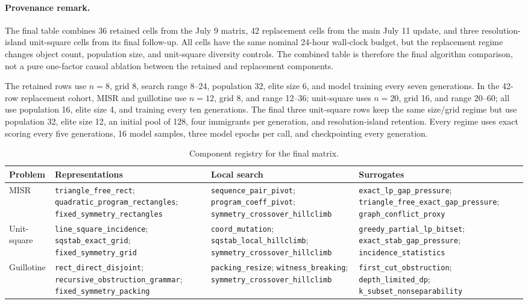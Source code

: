 \documentclass[11pt]{article}
\newcommand{\code}[1]{\texttt{#1}}
\begin{document}
\paragraph{Provenance remark.}
The final table combines 36 retained cells from the July 9 matrix, 42
replacement cells from the main July 11 update, and three resolution-island
unit-square cells from its final follow-up.  All cells have the same
nominal 24-hour wall-clock budget, but the replacement regime changes object
count, population size, and unit-square diversity controls.  The combined
table is therefore the final algorithm comparison, not a pure one-factor
causal ablation between the retained and replacement components.

The retained rows use $n=8$, grid 8, search range 8--24, population 32, elite
size 6, and model training every seven generations.  In the 42-row replacement
cohort, MISR and guillotine use $n=12$, grid 8, and range 12--36; unit-square
uses $n=20$, grid 16, and range 20--60; all use population 16, elite size 4,
and training every ten generations.  The final three unit-square rows keep the
same size/grid regime but use population 32, elite size 12, an initial pool of
128, four immigrants per generation, and resolution-island retention.  Every
regime uses exact scoring every five generations, 16 model samples, three
model epochs per call, and checkpointing every generation.

\begin{table}[tbp]
\centering
\caption{Component registry for the final matrix.}
\label{tab:component-registry}
\scriptsize
\begin{tabularx}{\textwidth}{p{}p{}p{}X}
\toprule
Problem & Representations & Local search & Surrogates \\
\midrule
MISR &
\code{triangle\_free\_rect};
\code{quadratic\_program\_rectangles};
\code{fixed\_symmetry\_rectangles} &
\code{sequence\_pair\_pivot};
\code{program\_coeff\_pivot};
\code{symmetry\_\allowbreak{}crossover\_\allowbreak{}hillclimb} &
\code{exact\_lp\_gap\_pressure};
\code{triangle\_free\_exact\_gap\_pressure};
\code{graph\_conflict\_proxy} \\
\addlinespace
Unit-square &
\code{line\_square\_incidence};
\code{sqstab\_exact\_grid};
\code{fixed\_symmetry\_grid} &
\code{coord\_mutation};
\code{sqstab\_local\_hillclimb};
\code{symmetry\_\allowbreak{}crossover\_\allowbreak{}hillclimb} &
\code{greedy\_partial\_lp\_bitset};
\code{exact\_stab\_gap\_pressure};
\code{incidence\_statistics} \\
\addlinespace
Guillotine &
\code{rect\_direct\_disjoint};
\code{recursive\_obstruction\_grammar};
\code{fixed\_symmetry\_packing} &
\code{packing\_resize};
\code{witness\_breaking};
\code{symmetry\_\allowbreak{}crossover\_\allowbreak{}hillclimb} &
\code{first\_cut\_obstruction};
\code{depth\_limited\_dp};
\code{k\_subset\_nonseparability} \\
\bottomrule
\end{tabularx}
\end{table}
\end{document}
